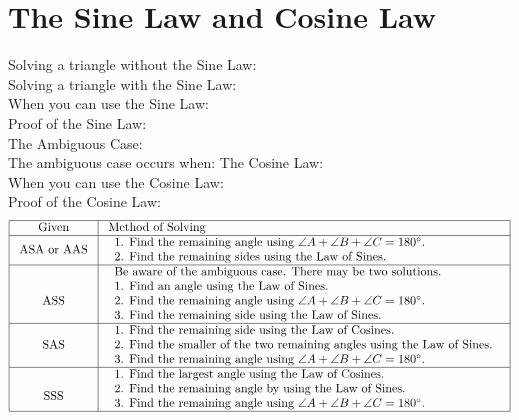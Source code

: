 \documentclass[12pt,fleqn]{book}
\begin{document}
\chapter{The Sine Law and Cosine Law}
Solving a triangle without the Sine Law:
\\[10em]
Solving a triangle with the Sine Law:
\\[10em]
When you can use the Sine Law:
\\[10em]
\clearpage 
Proof of the Sine Law:
\\[300em]
The Ambiguous Case:
\\[5em]
The ambiguous case occurs when:
\clearpage 
The Cosine Law:
\\[10em]
When you can use the Cosine Law:
\\[10em]
Proof of the Cosine Law:
\vfill 
\[
\begin{array}{|c|l|}
\hline \text { Given } & \text { Method of Solving } \\
\hline \text { ASA or AAS } & \begin{array}{l}
\text { 1. Find the remaining angle using } \angle A+\angle B+\angle C=180^{\circ} . \\
\text { 2. Find the remaining sides using the Law of Sines. }
\end{array} \\
\hline \multirow{2}{*}{\text { ASS }} & \begin{array}{l}
\text { Be aware of the ambiguous case. There may be two solutions. } \\
\text { 1. Find an angle using the Law of Sines. } \\
\text { 2. Find the remaining angle using } \angle A+\angle B+\angle C=180^{\circ} . \\
\text { 3. Find the remaining side using the Law of Sines. }
\end{array} \\
\hline \text { SAS } & \begin{array}{l}
\text { 1. Find the remaining side using the Law of Cosines. } \\
\text { 2. Find the smaller of the two remaining angles using the Law of Sines. } \\
\text { 3. Find the remaining angle using } \angle A+\angle B+\angle C=180^{\circ} .
\end{array} \\
\hline \multirow{2}{*}{\text { SSS }} & \begin{array}{l}
\text { 1. Find the largest angle using the Law of Cosines. } \\
\text { 2. Find the remaining angle by using the Law of Sines. } \\
\text { 3. Find the remaining angle using } \angle A+\angle B+\angle C=180^{\circ} .
\end{array} \\
\hline
\end{array}
\]
	\clearpage 
\end{document}
